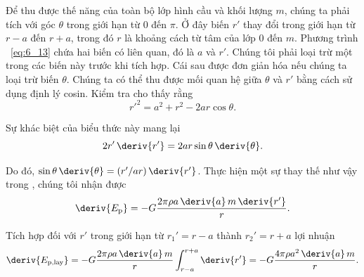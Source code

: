 Để thu được thế năng của toàn bộ lớp hình cầu và khối lượng $ m $, chúng ta phải tích  với góc $\theta$ trong giới hạn từ $0$ đến $\pi$. Ở đây biến $r'$ thay đổi trong giới hạn từ $r-a$ đến $r+a$, trong đó $r$ là khoảng cách từ tâm của lớp $0$ đến $m$. Phương trình ~\eqref{eq:6_13} chứa hai biến có liên quan, đó là $a$ và $r'$. Chúng tôi phải loại trừ một trong các biến này trước khi tích hợp. Cái sau được đơn giản hóa nếu chúng ta loại trừ biến $\theta$. Chúng ta có thể thu được mối quan hệ giữa $\theta$ và $r'$ bằng cách sử dụng định lý cosin. Kiểm tra  cho thấy rằng
\begin{equation*}
	r'^2 = a^2 + r^2 - 2ar\cos\theta.
\end{equation*}

\noindent
Sự khác biệt của biểu thức này mang lại
\begin{equation*}
	2r'\,\deriv{r'} = 2ar\sin\theta\,\deriv{\theta}.
\end{equation*}

\noindent
Do đó, $\sin\theta\,\deriv{\theta}=(r'/ar)\,\deriv{r'}$. Thực hiện một sự thay thế như vậy trong , chúng tôi nhận được
\begin{equation*}
	\deriv{E_{\text{p}}} = -G\frac{2\pi\rho a\,\deriv{a}\,m\,\deriv{r'}}{r}.
\end{equation*}

\noindent
Tích hợp đối với $r'$ trong giới hạn từ $r_1'=r-a$ thành $r_2'=r+a$ lợi nhuận
\begin{equation}\label{eq:6_14}
	\deriv{E_{\text{p,lay}}} = -G\frac{2\pi\rho a\,\deriv{a}\,m}{r} \int_{r-a}^{r+a} \deriv{r'} = -G\frac{4\pi\rho a^2\,\deriv{a}\,m}{r}.
\end{equation}

